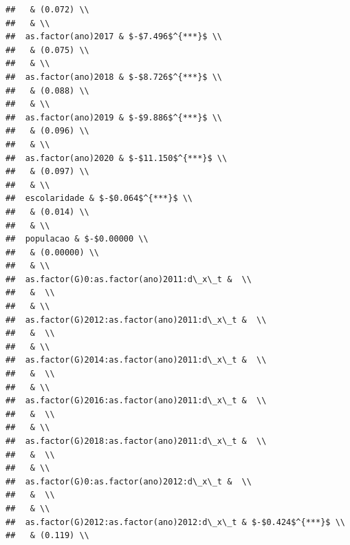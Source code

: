 \documentclass[
]{article}
\begin{document}
\begin{verbatim}
##   & (0.072) \\ 
##   & \\ 
##  as.factor(ano)2017 & $-$7.496$^{***}$ \\ 
##   & (0.075) \\ 
##   & \\ 
##  as.factor(ano)2018 & $-$8.726$^{***}$ \\ 
##   & (0.088) \\ 
##   & \\ 
##  as.factor(ano)2019 & $-$9.886$^{***}$ \\ 
##   & (0.096) \\ 
##   & \\ 
##  as.factor(ano)2020 & $-$11.150$^{***}$ \\ 
##   & (0.097) \\ 
##   & \\ 
##  escolaridade & $-$0.064$^{***}$ \\ 
##   & (0.014) \\ 
##   & \\ 
##  populacao & $-$0.00000 \\ 
##   & (0.00000) \\ 
##   & \\ 
##  as.factor(G)0:as.factor(ano)2011:d\_x\_t &  \\ 
##   &  \\ 
##   & \\ 
##  as.factor(G)2012:as.factor(ano)2011:d\_x\_t &  \\ 
##   &  \\ 
##   & \\ 
##  as.factor(G)2014:as.factor(ano)2011:d\_x\_t &  \\ 
##   &  \\ 
##   & \\ 
##  as.factor(G)2016:as.factor(ano)2011:d\_x\_t &  \\ 
##   &  \\ 
##   & \\ 
##  as.factor(G)2018:as.factor(ano)2011:d\_x\_t &  \\ 
##   &  \\ 
##   & \\ 
##  as.factor(G)0:as.factor(ano)2012:d\_x\_t &  \\ 
##   &  \\ 
##   & \\ 
##  as.factor(G)2012:as.factor(ano)2012:d\_x\_t & $-$0.424$^{***}$ \\ 
##   & (0.119) \\ 

\end{verbatim}
\end{document}
